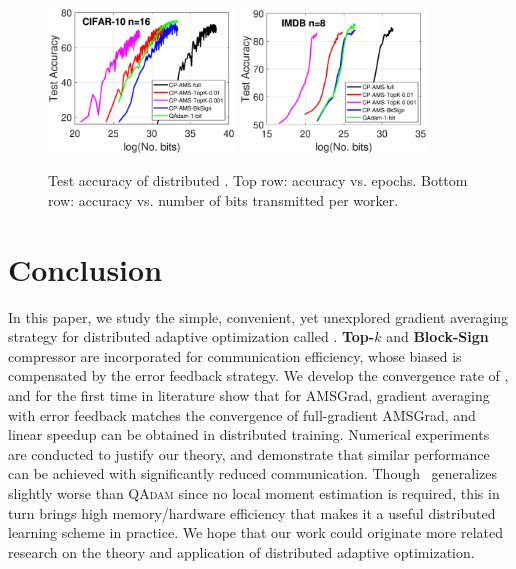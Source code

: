 \documentclass[11pt]{article}
\begin{document}
\begin{figure}[h]
\begin{center}
{        \includegraphics[width=1.95in]{fig/cifar_lenet_test_accuracy_16_vs_bits_Qadamsign.eps}
        \hspace{-0.1in}
        \includegraphics[width=1.95in]{fig/imbd_lstm_test_accuracy_8_vs_bits_Qadamsign_tk001.eps}
    }
    \end{center}
	\caption{Test accuracy of distributed \algo. Top row: accuracy vs. epochs. Bottom row: accuracy vs. number of bits transmitted per worker.}
	\label{fig:test accuracy dist}
\end{figure}


\section{Conclusion}\label{sec:conclusion}

In this paper, we study the simple, convenient, yet unexplored gradient averaging strategy for distributed adaptive optimization called \algo. \textbf{Top-$k$} and \textbf{Block-Sign} compressor are incorporated for communication efficiency, whose biased is compensated by the error feedback strategy. We develop the convergence rate of \algo, and for the first time in literature show that for AMSGrad, gradient averaging with error feedback matches the convergence of full-gradient AMSGrad, and linear speedup can be obtained in distributed training. Numerical experiments are conducted to justify our theory, and demonstrate that similar performance can be achieved with significantly reduced communication. Though \algo\ generalizes slightly worse than \textsc{QAdam} since no local moment estimation is required, this in turn brings high memory/hardware efficiency that makes it a useful distributed learning scheme in practice. We hope that our work could originate more related research on the theory and application of distributed adaptive optimization.
\end{document}

